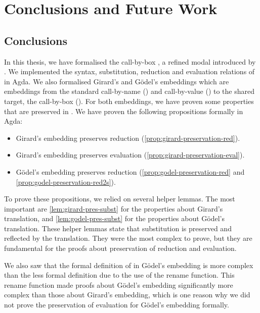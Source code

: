 \chapter{Conclusions and Future Work}\label{conclusions}
\section{Conclusions}
In this thesis, we have formalised the call-by-box \lc, a refined modal \lc introduced by \cite{espritosanto_et_al:LIPIcs:2019:10525}.
We implemented the syntax, substitution, reduction and evaluation relations of \lab in Agda.
We also formalised Girard's and Gödel's embeddings which are embeddings from the standard call-by-name \lc (\lan) and call-by-value \lc (\lav) to the shared target, the call-by-box \lc (\lab).
For both embeddings, we have proven some properties that are preserved in \lab. We have proven the following propositions formally in Agda:

\begin{itemize}
  \item Girard's embedding preserves reduction (\cref{prop:girard-preservation-red}).
  \item Girard's embedding preserves evaluation (\cref{prop:girard-preservation-eval}).
  \item Gödel's embedding preserves reduction (\cref{prop:godel-preservation-red} and \ref{prop:godel-preservation-red2s}).
\end{itemize}

To prove these propositions, we relied on several helper lemmas.
The most important are \cref{lem:girard-pres-subst} for the properties about Girard's translation,
and \cref{lem:godel-pres-subst} for the properties about Gödel's translation.
These helper lemmas state that substitution is preserved and reflected by the translation.
They were the most complex to prove, but they are fundamental for the proofs about preservation of reduction and evaluation.

We also saw that the formal definition of \raiseembn in Gödel's embedding is more complex than the less formal definition due to the use of the rename function.
This rename function made proofs about Gödel's embedding significantly more complex than those about Girard's embedding,
which is one reason why we did not prove the preservation of evaluation for Gödel's embedding formally. 

